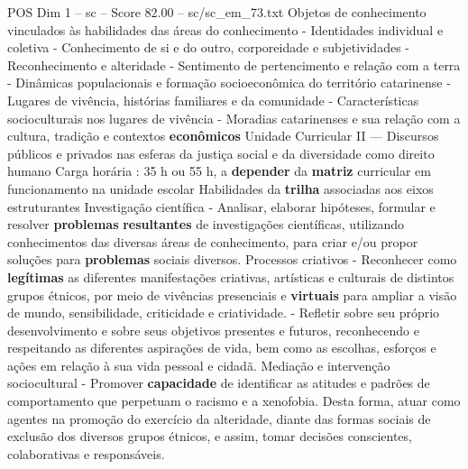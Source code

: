 \begin{textsample}{POS Dim 1 – sc – Score 82.00 – sc/sc\_em\_73.txt}
Objetos de conhecimento vinculados às habilidades das áreas do conhecimento - Identidades individual e coletiva - Conhecimento de si e do outro, corporeidade e subjetividades - Reconhecimento e alteridade - Sentimento de pertencimento e relação com a terra - Dinâmicas populacionais e formação socioeconômica do território catarinense - Lugares de vivência, histórias familiares e da comunidade - Características socioculturais nos lugares de vivência - Moradias catarinenses e sua relação com a cultura, tradição e contextos \textbf{econômicos} Unidade Curricular II — Discursos públicos e privados nas esferas da justiça social e da diversidade como direito humano Carga horária : 35 h ou 55 h, a \textbf{depender} da \textbf{matriz} curricular em funcionamento na unidade escolar Habilidades da \textbf{trilha} associadas aos eixos estruturantes Investigação científica - Analisar, elaborar hipóteses, formular e resolver \textbf{problemas} \textbf{resultantes} de investigações científicas, utilizando conhecimentos das diversas áreas de conhecimento, para criar e/ou propor soluções para \textbf{problemas} sociais diversos.
Processos criativos - Reconhecer como \textbf{legítimas} as diferentes manifestações criativas, artísticas e culturais de distintos grupos étnicos, por meio de vivências presenciais e \textbf{virtuais} para ampliar a visão de mundo, sensibilidade, criticidade e criatividade. - Refletir sobre seu próprio desenvolvimento e sobre seus objetivos presentes e futuros, reconhecendo e respeitando as diferentes aspirações de vida, bem como as escolhas, esforços e ações em relação à sua vida pessoal e cidadã.
Mediação e intervenção sociocultural - Promover \textbf{capacidade} de identificar as atitudes e padrões de comportamento que perpetuam o racismo e a xenofobia.
Desta forma, atuar como agentes na promoção do exercício da alteridade, diante das formas sociais de exclusão dos diversos grupos étnicos, e assim, tomar decisões conscientes, colaborativas e responsáveis.

\end{textsample}
